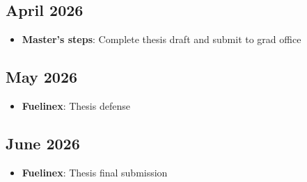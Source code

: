\documentclass{article}
\begin{document}
\subsection*{April 2026}
\begin{itemize}
    \item \textbf{Master's steps}: Complete thesis draft and submit to grad office
\end{itemize}

\subsection*{May 2026}
\begin{itemize}
    \item \textbf{Fuelinex}: Thesis defense
\end{itemize}

\subsection*{June 2026}
\begin{itemize}
    \item \textbf{Fuelinex}: Thesis final submission
\end{itemize}


\end{document}
